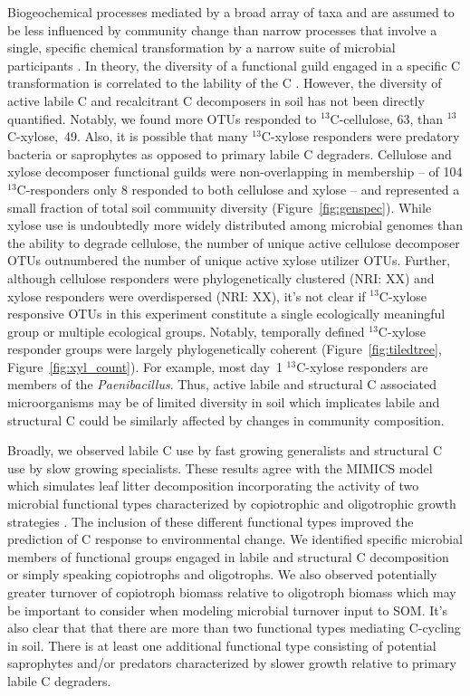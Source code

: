 Biogeochemical processes mediated by a broad array of taxa and are assumed to
be less influenced by community change than narrow processes that involve
a single, specific chemical transformation by a narrow suite of microbial
participants \citep{Schimel_1995,McGuire2010}. In theory, the diversity of
a functional guild engaged in a specific C transformation is correlated to the
lability of the C \citep{McGuire2010}. However, the diversity of active
labile C and recalcitrant C decomposers in soil has not been directly
quantified. Notably, we found more OTUs responded to $^{13}$C-cellulose, 63,
than $^{13}$C-xylose,~49. Also, it is possible that many $^{13}$C-xylose
responders were predatory bacteria or saprophytes as opposed to primary labile
C degraders. Cellulose and xylose decomposer functional guilds were
non-overlapping in membership -- of 104 $^{13}$C-responders only 8 responded to
both cellulose and xylose -- and represented a small fraction of total soil
community diversity (Figure~\ref{fig:genspec}). While xylose use is undoubtedly
more widely distributed among microbial genomes than the ability to degrade
cellulose, the number of unique active cellulose decomposer OTUs outnumbered
the number of unique active xylose utilizer OTUs. Further, although cellulose
responders were phylogenetically clustered (NRI: XX) and xylose responders were
overdispersed (NRI: XX), it's not clear if $^{13}$C-xylose responsive OTUs in
this experiment constitute a single ecologically meaningful group or multiple
ecological groups. Notably, temporally defined $^{13}$C-xylose responder groups
were largely phylogenetically coherent (Figure~\ref{fig:tiledtree},
Figure~\ref{fig:xyl_count}). For example, most day~1 $^{13}$C-xylose responders
are members of the \textit{Paenibacillus}. Thus, active labile and structural
C associated microorganisms may be of limited diversity in soil which
implicates labile and structural C could be similarly affected by changes in
community composition. 

Broadly, we observed labile C use by fast growing generalists and structural
C use by slow growing specialists. These results agree with the MIMICS model
which simulates leaf litter decomposition incorporating the activity of two
microbial functional types characterized by copiotrophic and
oligotrophic growth strategies \citep{wieder_2014a}. The inclusion of these
different functional types improved the prediction of C response to
environmental change. We identified specific microbial members of functional
groups engaged in labile and structural C decomposition or simply speaking
copiotrophs and oligotrophs. We also observed potentially greater turnover of
copiotroph biomass relative to oligotroph biomass which may be
important to consider when modeling microbial turnover input to SOM. It's also
clear that that there are more than two functional types mediating C-cycling in
soil. There is at least one additional functional type consisting of potential
saprophytes and/or predators characterized by slower growth relative to primary
labile C degraders. 

